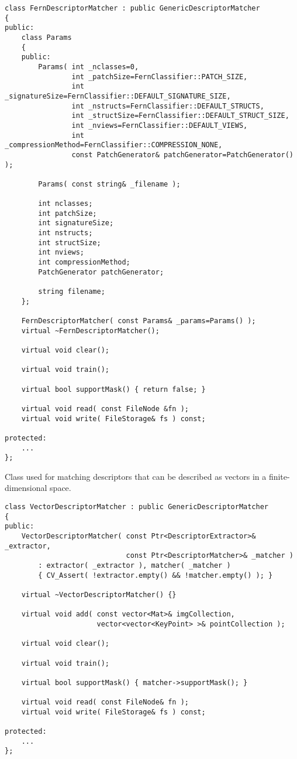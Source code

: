 \begin{lstlisting}
class FernDescriptorMatcher : public GenericDescriptorMatcher
{
public:
    class Params
    {
    public:
        Params( int _nclasses=0,
                int _patchSize=FernClassifier::PATCH_SIZE,
                int _signatureSize=FernClassifier::DEFAULT_SIGNATURE_SIZE,
                int _nstructs=FernClassifier::DEFAULT_STRUCTS,
                int _structSize=FernClassifier::DEFAULT_STRUCT_SIZE,
                int _nviews=FernClassifier::DEFAULT_VIEWS,
                int _compressionMethod=FernClassifier::COMPRESSION_NONE,
                const PatchGenerator& patchGenerator=PatchGenerator() );

        Params( const string& _filename );

        int nclasses;
        int patchSize;
        int signatureSize;
        int nstructs;
        int structSize;
        int nviews;
        int compressionMethod;
        PatchGenerator patchGenerator;

        string filename;
    };

    FernDescriptorMatcher( const Params& _params=Params() );
    virtual ~FernDescriptorMatcher();

    virtual void clear();

    virtual void train();

    virtual bool supportMask() { return false; }

    virtual void read( const FileNode &fn );
    virtual void write( FileStorage& fs ) const;
    
protected:
	...
};
\end{lstlisting}

Class used for matching descriptors that can be described as vectors in a finite-dimensional space.

\begin{lstlisting}
class VectorDescriptorMatcher : public GenericDescriptorMatcher
{
public:
    VectorDescriptorMatcher( const Ptr<DescriptorExtractor>& _extractor, 
                             const Ptr<DescriptorMatcher>& _matcher ) 
	    : extractor( _extractor ), matcher( _matcher ) 
        { CV_Assert( !extractor.empty() && !matcher.empty() ); }
        
    virtual ~VectorDescriptorMatcher() {}

    virtual void add( const vector<Mat>& imgCollection,
                      vector<vector<KeyPoint> >& pointCollection );

    virtual void clear();

    virtual void train();

    virtual bool supportMask() { matcher->supportMask(); }

    virtual void read( const FileNode& fn );
    virtual void write( FileStorage& fs ) const;

protected:
    ...
};
\end{lstlisting}

